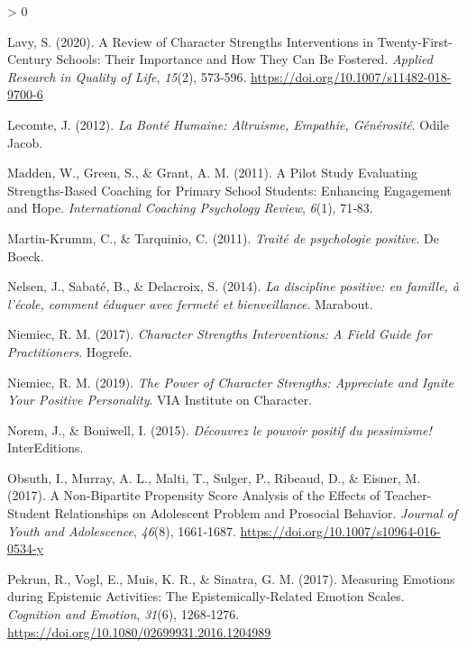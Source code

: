 \documentclass[
  french,
]{article}
\newlength{\cslhangindent}
\newenvironment{CSLReferences}[2] %
 {%
  \setlength{\parindent}{0pt}
  \ifodd #1 \everypar{\setlength{\hangindent}{\cslhangindent}}\ignorespaces\fi
  \ifnum #2 > 0
  \setlength{\parskip}{#2\baselineskip}
  \fi
 }%
 {}
\begin{document}
\begin{CSLReferences}{1}{0}
\leavevmode\hypertarget{ref-lavy2020}{}%
Lavy, S. (2020). A {Review} of {Character Strengths Interventions} in {Twenty}-{First}-{Century Schools}: Their {Importance} and {How} They Can Be {Fostered}. \emph{Applied Research in Quality of Life}, \emph{15}(2), 573‑596. \url{https://doi.org/10.1007/s11482-018-9700-6}

\leavevmode\hypertarget{ref-lecomte2012c}{}%
Lecomte, J. (2012). \emph{La Bonté Humaine: {Altruisme}, Empathie, Générosité}. {Odile Jacob}.

\leavevmode\hypertarget{ref-madden2011}{}%
Madden, W., Green, S., \& Grant, A. M. (2011). A Pilot Study Evaluating Strengths-Based Coaching for Primary School Students: {Enhancing} Engagement and Hope. \emph{International Coaching Psychology Review}, \emph{6}(1), 71‑83.

\leavevmode\hypertarget{ref-martin-krumm2011}{}%
Martin-Krumm, C., \& Tarquinio, C. (2011). \emph{{Traité de psychologie positive}}. {De Boeck}.

\leavevmode\hypertarget{ref-nelsen2014}{}%
Nelsen, J., Sabaté, B., \& Delacroix, S. (2014). \emph{{La discipline positive: en famille, à l'école, comment éduquer avec fermeté et bienveillance}}. {Marabout}.

\leavevmode\hypertarget{ref-niemiec2017b}{}%
Niemiec, R. M. (2017). \emph{Character Strengths Interventions: A Field Guide for Practitioners}. {Hogrefe}.

\leavevmode\hypertarget{ref-niemiec2019a}{}%
Niemiec, R. M. (2019). \emph{The {Power} of Character Strengths: Appreciate and Ignite Your Positive Personality}. {VIA Institute on Character}.

\leavevmode\hypertarget{ref-norem2015}{}%
Norem, J., \& Boniwell, I. (2015). \emph{{Découvrez le pouvoir positif du pessimisme!}} {InterEditions}.

\leavevmode\hypertarget{ref-obsuth2017}{}%
Obsuth, I., Murray, A. L., Malti, T., Sulger, P., Ribeaud, D., \& Eisner, M. (2017). A {Non}-Bipartite {Propensity Score Analysis} of the {Effects} of {Teacher}-{Student Relationships} on {Adolescent Problem} and {Prosocial Behavior}. \emph{Journal of Youth and Adolescence}, \emph{46}(8), 1661‑1687. \url{https://doi.org/10.1007/s10964-016-0534-y}

\leavevmode\hypertarget{ref-pekrun2017}{}%
Pekrun, R., Vogl, E., Muis, K. R., \& Sinatra, G. M. (2017). Measuring Emotions during Epistemic Activities: The {Epistemically}-{Related Emotion Scales}. \emph{Cognition and Emotion}, \emph{31}(6), 1268‑1276. \url{https://doi.org/10.1080/02699931.2016.1204989}


\end{CSLReferences}
\end{document}
